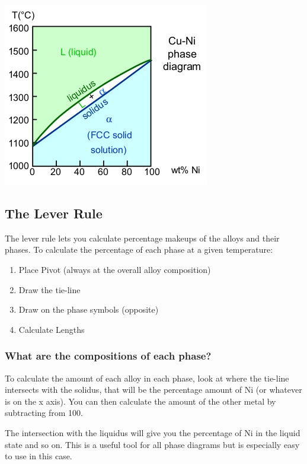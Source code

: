 \documentclass[12pt]{article}
\begin{document}
\begin{center}
  \includegraphics[scale=0.5]{binaryisomorphous}
\end{center}

\subsection{The Lever Rule}
The lever rule lets you calculate percentage makeups of the alloys and their phases.
To calculate the percentage of each phase at a given temperature:
\begin{enumerate}
  \item Place Pivot (always at the overall alloy composition)
  \item Draw the tie-line
  \item Draw on the phase symbols (opposite)
  \item Calculate Lengths
\end{enumerate}

\subsubsection{What are the compositions of each phase?}
To calculate the amount of each alloy in each phase, look at where the tie-line intersects with the solidus, that will be the percentage amount of Ni (or whatever is on the x axis).
You can then calculate the amount of the other metal by subtracting from 100. 

The intersection with the liquidus will give you the percentage of Ni in the liquid state and so on.
This is a useful tool for all phase diagrams but is especially easy to use in this case.
\end{document}
